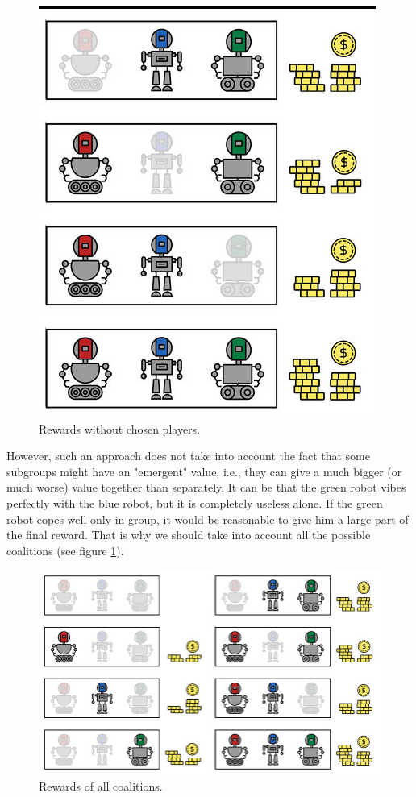\documentclass[magisterska,en]{pracamgr}
\begin{document}
\begin{figure}[H]
\centering
\includegraphics[scale=0.3]{./images/Shap_coal_2.png}
\caption{Rewards without chosen players.}
\end{figure}

However, such an approach does not take into account the fact that some subgroups might have an "emergent" value, i.e., they can give a much bigger (or much worse) value together than separately. It can be that the green robot vibes perfectly with the blue robot, but it is completely useless alone. If the green robot copes well only in group, it would be reasonable to give him a large part of the final reward. That is why we should take into account all the possible coalitions (see figure \ref{rewards_all}).

\begin{figure}[H]
\centering
\includegraphics[scale=0.3]{./images/Shap_all_coal.png}
\caption{Rewards of all coalitions.}
\label{rewards_all}
\end{figure}
\end{document}
